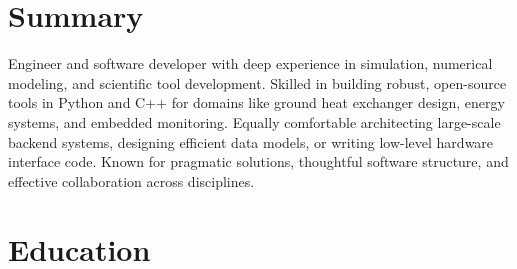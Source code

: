 \documentclass[11pt,a4paper,sans]{moderncv}
\begin{document}
\makecvtitle

\section{Summary}
Engineer and software developer with deep experience in simulation, numerical modeling, and scientific tool development. Skilled in building robust, open-source tools in Python and C++ for domains like ground heat exchanger design, energy systems, and embedded monitoring. Equally comfortable architecting large-scale backend systems, designing efficient data models, or writing low-level hardware interface code. Known for pragmatic solutions, thoughtful software structure, and effective collaboration across disciplines.

\section{Education}
\end{document}
